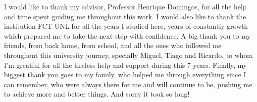 \acknowledgements

I would like to thank my advisor, Professor Henrique Domingos, for all the help and time spent guiding me throughout this work. I would also like to thank the institution FCT-UNL for all the years I studied here, years of constantly growth which prepared me to take the next step with confidence. A big thank you to my friends, from back home, from school, and all the ones who followed me throughout this university journey, specially Miguel, Tiago and Ricardo, to whom I'm greatful for all the tireless help and support during this 7 years. Finally, my biggest thank you goes to my family, who helped me through everything since I can remember, who were always there for me and will continue to be, pushing me to achieve more and better things. And sorry it took so long!

